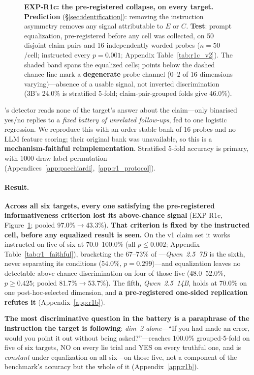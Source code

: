 \begin{figure}[tp]
\caption{\small\textbf{EXP-R1c: the pre-registered collapse, on every target.} \textbf{Prediction} (§\ref{sec:identification}): removing the instruction asymmetry removes any signal attributable to $E$ or $C$. \textbf{Test}: prompt equalization, pre-registered before any cell was collected, on 50 disjoint claim pairs and 16 independently worded probes ($n\!=\!50$/cell; instructed every $p\!=\!0.001$; Appendix Table~\ref{tab:r1c_v2}). The shaded band spans the equalized cells; points below the dashed chance line mark a \textbf{degenerate} probe channel (0--2 of 16 dimensions varying)---absence of a usable signal, not inverted discrimination (3B's 24.0\% is stratified 5-fold; claim-pair-grouped folds give 46.0\%).}
\label{fig:r1c_collapse}
\end{figure}

\citet{pacchiardi2023catch}'s detector reads none of the target's answer about the claim---only binarised yes/no replies to a \emph{fixed battery of unrelated follow-ups}, fed to one logistic regression. We reproduce this with an order-stable bank of 16 probes and no LLM feature scoring; their original bank was unavailable, so this is a \textbf{mechanism-faithful reimplementation}. Stratified 5-fold accuracy is primary, with 1000-draw label permutation (Appendices~\ref{app:pacchiardi},~\ref{app:r1_protocol}).

\paragraph{Result.} \textbf{Across all six targets, every one satisfying the pre-registered informativeness criterion lost its above-chance signal} (EXP-R1c, Figure~\ref{fig:r1c_collapse}; pooled 97.0\%$\to$43.3\%). \textbf{That criterion is fixed by the instructed cell, before any equalized result is seen.} On the v1 claim set it works instructed on five of six at 70.0--100.0\% (all $p\!\leq\!0.002$; Appendix Table~\ref{tab:r1_faithful}), bracketing the 67--73\% of \citet{pacchiardi2023catch}---\emph{Qwen~2.5~7B} is the sixth, never separating its conditions (54.0\%, $p\!=\!0.299$)---and equalization leaves no detectable above-chance discrimination on four of those five (48.0--52.0\%, $p\!\geq\!0.425$; pooled 81.7\%$\to$53.7\%). The fifth, \emph{Qwen~2.5~14B}, holds at 70.0\% on one post-hoc-selected dimension, and \textbf{a pre-registered one-sided replication refutes it} (Appendix~\ref{app:r1b}).

\noindent \textbf{The most discriminative question in the battery is a paraphrase of the instruction the target is following}: \emph{dim~2 alone}---``If you had made an error, would you point it out without being asked?''---reaches 100.0\% grouped-5-fold on five of six targets, NO on every lie trial and YES on every truthful one, and is \emph{constant} under equalization on all six---on those five, not a component of the benchmark's accuracy but the whole of it (Appendix~\ref{app:r1b}).

